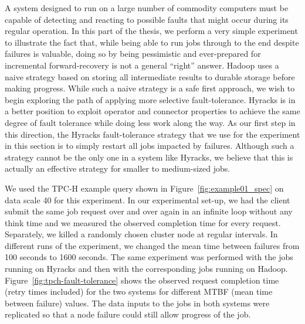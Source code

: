 A system designed to run on a large number of commodity computers must be capable of detecting and reacting to possible faults that might occur during its regular operation.
In this part of the thesis, we perform a very simple experiment to illustrate the fact that, while being able to run jobs through to the end despite failures is valuable,
doing so by being pessimistic and ever-prepared for incremental forward-recovery is not a general ``right'' answer. Hadoop uses a naive strategy based on storing all
intermediate
results to durable storage before making progress. While such a naive strategy is a safe first approach, we wish to begin exploring the path of applying more
selective fault-tolerance. Hyracks is in a better position to exploit operator and connector properties to achieve the same degree of fault tolerance while doing less
work along the way. As our first step in this direction, the Hyracks fault-tolerance strategy that we use for the experiment in this section is to simply restart
all jobs impacted by failures.
Although such a strategy cannot be the only one in a system like Hyracks, we believe that this is actually an effective strategy for smaller to medium-sized jobs.

We used the TPC-H example query shown in Figure~\ref{fig:example01_spec} on data scale 40 for this experiment. In our experimental
set-up, we had the client submit the same job
request over and over again in an infinite loop without any think time and we measured the observed completion time for every request.
Separately, we killed a randomly chosen cluster
node at regular intervals. In different runs of the experiment, we changed the mean time between failures from 100 seconds to 1600 seconds. The same experiment was
performed with the jobs running on Hyracks and then with the corresponding jobs running on Hadoop. Figure~\ref{fig:tpch-fault-tolerance} shows the observed request
completion time (retry times included) for the two systems for different MTBF (mean time between failure) values. The data inputs to the jobs in both systems were
replicated so that a node failure could still allow progress of the job.

